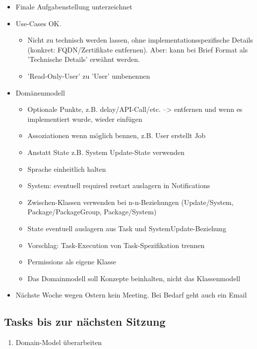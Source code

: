 \documentclass[class=scrbook,crop=false]{standalone}
\begin{document}
	\begin{itemize}
        \item Finale Aufgabenstellung unterzeichnet
        \item Use-Cases OK.
        \begin{itemize}
            \item Nicht zu technisch werden lassen, ohne implementationsspezifische Details (konkret: FQDN/Zertifikate entfernen). Aber: kann bei Brief Format als 'Technische Details' erwähnt werden.
            \item 'Read-Only-User' zu 'User' umbenennen
        \end{itemize}
        \item Domänenmodell
        \begin{itemize}
            \item Optionale Punkte, z.B. delay/API-Call/etc. --> entfernen und wenn es implementiert wurde, wieder einfügen
            \item Assoziationen wenn möglich bennen, z.B. User erstellt Job
            \item Anstatt State z.B. System Update-State verwenden
            \item Sprache einheitlich halten
            \item System: eventuell required restart auslagern in Notifications
            \item Zwischen-Klassen verwenden bei n-n-Beziehungen (Update/System, Package/PackageGroup, Package/System)
            \item State eventuell auslagern aus Task und SystemUpdate-Beziehung
            \item Vorschlag: Task-Execution von Task-Spezifikation trennen
            \item Permissions als eigene Klasse
            \item Das Domainmodell soll Konzepte beinhalten, nicht das Klassenmodell
        \end{itemize}
        \item Nächste Woche wegen Ostern kein Meeting. Bei Bedarf geht auch ein Email
    \end{itemize}
	
    \subsection*{Tasks bis zur nächsten Sitzung}
    
    \begin{enumerate}
        \item Domain-Model überarbeiten
    \end{enumerate}
\end{document}
